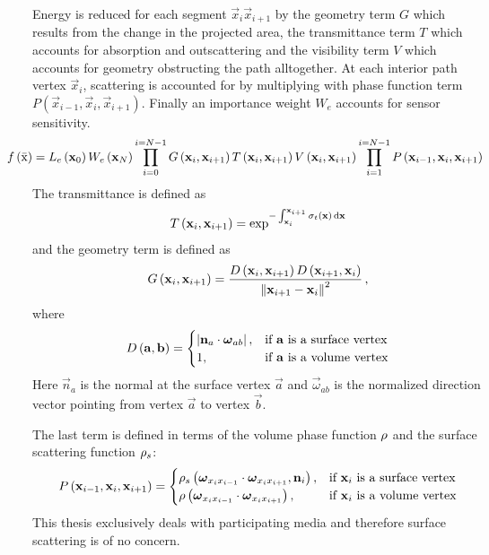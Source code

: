 Energy is reduced for each segment $\vec{x}_i \vec{x}_{i+1}$ by the geometry term $G$ which results from the change in the projected area, the transmittance term $T$ which accounts for absorption and outscattering and the visibility term $V$ which accounts for geometry obstructing the path alltogether. At each interior path vertex $\vec{x}_i$, scattering is accounted for by multiplying with phase function term $P(\vec{x}_{i-1}, \vec{x}_i, \vec{x}_{i+1})$. Finally an importance weight $W_e$ accounts for sensor sensitivity.
\begin{align}
\hspace{-.3in}
f\left(\bar{\mathrm{x}}\right) =
L_e\left(\vec{x}_0\right)
W_e\left(\vec{x}_N\right)
\prod_{i=0}^{i=N-1}
G\left(\vec{x}_i, \vec{x}_{i+1}\right)
T\left(\vec{x}_i, \vec{x}_{i+1}\right)
V\left(\vec{x}_i, \vec{x}_{i+1}\right)
\prod_{i=1}^{i=N-1}
P\left(\vec{x}_{i-1}, \vec{x}_i, \vec{x}_{i+1}\right)
\label{eq:foundations_mc_pathintegral}
\end{align}
The transmittance is defined as
\begin{align}
T\left(\boldsymbol{\mathbf{x}}_i, \boldsymbol{\mathbf{x}}_{i+1}\right) =
\operatorname{exp}^
{
    -\int_{\boldsymbol{\mathbf{x}}_i}^{\boldsymbol{\mathbf{x}}_{i+1}}\sigma_t\left(\boldsymbol{\mathbf{x}}\right)\,\mathrm{d}\boldsymbol{\mathbf{x}}
}
\end{align}
and the geometry term is defined as
\begin{align}
G\left(\boldsymbol{\mathbf{x}}_i, \boldsymbol{\mathbf{x}}_{i+1}\right) =
\frac{D\left(\boldsymbol{\mathbf{x}}_{i}, \boldsymbol{\mathbf{x}}_{i+1}\right)D\left(\boldsymbol{\mathbf{x}}_{i+1}, \boldsymbol{\mathbf{x}}_{i}\right)}{\left\lVert\boldsymbol{\mathbf{x}}_{i+1}-\boldsymbol{\mathbf{x}}_{i}\right\rVert^2} \,,
\end{align}
where
\begin{align}
D\left(\boldsymbol{\mathbf{a}}, \boldsymbol{\mathbf{b}}\right) =
\begin{cases}
\left\vert\boldsymbol{\mathbf{n}}_a\cdot\boldsymbol{\mathbf{\omega}}_{ab}\right\vert, & \text{if $\boldsymbol{\mathbf{a}}$ is a surface vertex}
\\
1, & \text{if $\boldsymbol{\mathbf{a}}$ is a volume vertex}
\end{cases}
\end{align}
Here $\vec{n}_a$ is the normal at the surface vertex $\vec{a}$ and $\vec{\omega}_{ab}$ is the normalized direction vector pointing from vertex $\vec{a}$ to vertex $\vec{b}$.

The last term is defined in terms of the volume phase function $\rho$ and the surface scattering function $\rho_s$:
\begin{align}
P\left(\boldsymbol{\mathbf{x}}_{i-1}, \boldsymbol{\mathbf{x}}_i, \boldsymbol{\mathbf{x}}_{i+1}\right) =
\begin{cases}
\rho_s\left(\boldsymbol{\mathbf{\omega}}_{x_ix_{i-1}}\cdot\boldsymbol{\mathbf{\omega}}_{x_ix_{i+1}}, \boldsymbol{\mathbf{n}}_i\right), & \text{if $\boldsymbol{\mathbf{x}}_i$ is a surface vertex}
\\
\rho\left(\boldsymbol{\mathbf{\omega}}_{x_ix_{i-1}}\cdot\boldsymbol{\mathbf{\omega}}_{x_ix_{i+1}}\right), & \text{if $\boldsymbol{\mathbf{x}}_i$ is a volume vertex}
\end{cases}
\end{align}
This thesis exclusively deals with participating media and therefore surface scattering is of no concern.

